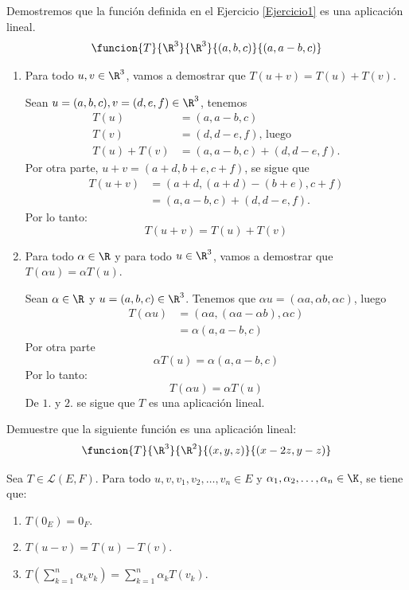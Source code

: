 \documentclass[compacto,10pt]{pubciencias-notas}
\begin{document}
\begin{ejem}
Demostremos que la función definida en el Ejercicio \ref{Ejercicio1} es una aplicación lineal.
\[
    \funcion{T}{\R^3}{\R^3}{(a,b,c)}{(a,a-b,c)}
\]
\begin{enumerate}
\item
    Para todo $u, v \in \R^{3}$, vamos a demostrar que $T(u+v) = T(u) + T(v)$.

    \noindent Sean $u = (a, b, c), v = (d, e, f) \in \R^{3}$, tenemos
    \begin{align*}
        T(u) & = (a,a-b,c) \\
        T(v) & = (d,d-e,f) \text{, luego} \\
        T(u) + T(v) & = (a,a-b,c) + (d,d-e,f).
    \end{align*}
    Por otra parte, $u+v = (a+d, b+e, c+f)$, se sigue que
    \begin{align*}
        T(u+v) & = (a + d,(a+d) - (b+e), c+f) \\
        & = (a,a-b, c) + (d,d-e,f).
    \end{align*}
    Por lo tanto:
    \[
        T(u+v) = T(u) + T(v)
    \]
    
\item
    Para todo $\alpha \in \R$ y para todo $u \in \R^{3}$, vamos a demostrar que $T(\alpha u) = \alpha T(u)$.
    
    Sean $\alpha \in \R$ y $u = (a, b, c) \in \R^{3}$. 
    Tenemos que $\alpha u = (\alpha a, \alpha b, \alpha c)$, luego
    \begin{align*}
    T(\alpha u) & = (\alpha a,(\alpha a - \alpha b) , \alpha c) \\
    & = \alpha (a, a-b, c)
    \end{align*}
    Por otra parte
    \[
        \alpha T(u) = \alpha (a ,a-b,c)
    \]
    Por lo tanto:
    \[
        T(\alpha u) = \alpha T(u)
    \]
    De $1.$ y $2.$ se sigue que $T$ es una aplicación lineal.
\end{enumerate}
\end{ejem}

\begin{ejer} 
Demuestre que la siguiente funci\'on es una aplicaci\'on lineal:
   \[
        \funcion{T}{\R^3}{\R^2}{(x,y,z)}{(x-2z,y-z)}
    \]
\end{ejer}
\begin{teo}
     Sea $T \in \mathscr{L}(E,F)$. Para todo $u,v, v_1, v_2, \ldots, v_n \in E$ y $\alpha_1, \alpha_2, \ldots, \alpha_n \in \K$, se tiene que:
     \begin{enumerate}
         \item $T(0_E) = 0_F$.
         \item $T(u-v) = T(u) - T(v)$.
         \item $T\left(\displaystyle \sum_{k=1}^n \alpha_k v_k \right)= 
         \displaystyle \sum_{k=1}^n \alpha_k T\left(v_k \right)$.
     \end{enumerate}
\end{teo}
\end{document}
